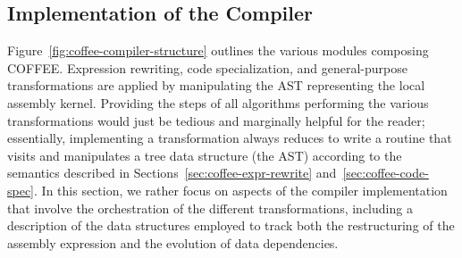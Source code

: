 \subsection{Implementation of the Compiler}
Figure~\ref{fig:coffee-compiler-structure} outlines the various modules composing COFFEE. Expression rewriting, code specialization, and general-purpose transformations are applied by manipulating the AST representing the local assembly kernel. Providing the steps of all algorithms performing the various transformations would just be tedious and marginally helpful for the reader; essentially, implementing a transformation always reduces to write a routine that visits and manipulates a tree data structure (the AST) according to the semantics described in Sections~\ref{sec:coffee-expr-rewrite} and~\ref{sec:coffee-code-spec}. In this section, we rather focus on aspects of the compiler implementation that involve the orchestration of the different transformations, including a description of the data structures employed to track both the restructuring of the assembly expression and the evolution of data dependencies. 

